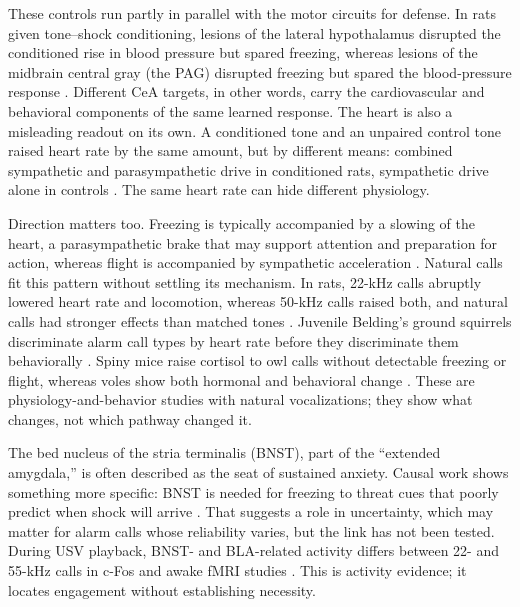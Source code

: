 These controls run partly in parallel with the motor circuits for defense. In rats given tone--shock conditioning, lesions of the lateral hypothalamus disrupted the conditioned rise in blood pressure but spared freezing, whereas lesions of the midbrain central gray (the PAG) disrupted freezing but spared the blood-pressure response \citep{LeDouxEtAl1988}. Different CeA targets, in other words, carry the cardiovascular and behavioral components of the same learned response. The heart is also a misleading readout on its own. A conditioned tone and an unpaired control tone raised heart rate by the same amount, but by different means: combined sympathetic and parasympathetic drive in conditioned rats, sympathetic drive alone in controls \citep{IwataLeDoux1988}. The same heart rate can hide different physiology.

Direction matters too. Freezing is typically accompanied by a slowing of the heart, a parasympathetic brake that may support attention and preparation for action, whereas flight is accompanied by sympathetic acceleration \citep{Roelofs2017}. Natural calls fit this pattern without settling its mechanism. In rats, 22-kHz calls abruptly lowered heart rate and locomotion, whereas 50-kHz calls raised both, and natural calls had stronger effects than matched tones \citep{OlszynskiEtAl2020}. Juvenile Belding's ground squirrels discriminate alarm call types by heart rate before they discriminate them behaviorally \citep{Mateo1996,Mateo2010}.
Spiny mice raise cortisol to owl calls without detectable freezing or flight, whereas voles show both hormonal and behavioral change \citep{EilamEtAl1999}. These are physiology-and-behavior studies with natural vocalizations; they show what changes, not which pathway changed it.

The bed nucleus of the stria terminalis (BNST), part of the ``extended amygdala,'' is often described as the seat of sustained anxiety. Causal work shows something more specific: BNST is needed for freezing to threat cues that poorly predict when shock will arrive \citep{GoodeEtAl2019}. That suggests a role in uncertainty, which may matter for alarm calls whose reliability varies, but the link has not been tested. During USV playback, BNST- and BLA-related activity differs between 22- and 55-kHz calls in c-Fos and awake fMRI studies \citep{DemaestriEtAl2019,GranataEtAl2024}. This is activity evidence; it locates engagement without establishing necessity.

